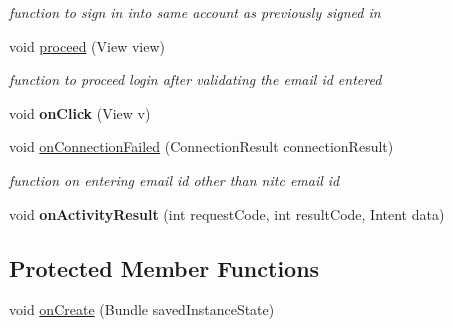 {\begin{DoxyCompactItemize}
\begin{DoxyCompactList}\small\item\em function to sign in into same account as previously signed in \end{DoxyCompactList}\item 
\hypertarget{classcom_1_1example_1_1sel_1_1lostfound_1_1MainActivity_a4618c5d451d4e0c2ce4562499a583ee5}{void \hyperlink{classcom_1_1example_1_1sel_1_1lostfound_1_1MainActivity_a4618c5d451d4e0c2ce4562499a583ee5}{proceed} (View view)}\label{classcom_1_1example_1_1sel_1_1lostfound_1_1MainActivity_a4618c5d451d4e0c2ce4562499a583ee5}

\begin{DoxyCompactList}\small\item\em function to proceed login after validating the email id entered \end{DoxyCompactList}\item 
\hypertarget{classcom_1_1example_1_1sel_1_1lostfound_1_1MainActivity_ac979afc8333ca7e81e7859cd383c614d}{void {\bfseries on\-Click} (View v)}\label{classcom_1_1example_1_1sel_1_1lostfound_1_1MainActivity_ac979afc8333ca7e81e7859cd383c614d}

\item 
\hypertarget{classcom_1_1example_1_1sel_1_1lostfound_1_1MainActivity_a15df38b4157a1f3a7c9dd7c8099e7495}{void \hyperlink{classcom_1_1example_1_1sel_1_1lostfound_1_1MainActivity_a15df38b4157a1f3a7c9dd7c8099e7495}{on\-Connection\-Failed} (Connection\-Result connection\-Result)}\label{classcom_1_1example_1_1sel_1_1lostfound_1_1MainActivity_a15df38b4157a1f3a7c9dd7c8099e7495}

\begin{DoxyCompactList}\small\item\em function on entering email id other than nitc email id \end{DoxyCompactList}\item 
\hypertarget{classcom_1_1example_1_1sel_1_1lostfound_1_1MainActivity_ad934ef9a9347dc67bcaf5365213f58da}{void {\bfseries on\-Activity\-Result} (int request\-Code, int result\-Code, Intent data)}\label{classcom_1_1example_1_1sel_1_1lostfound_1_1MainActivity_ad934ef9a9347dc67bcaf5365213f58da}

\end{DoxyCompactItemize}
\subsection*{Protected Member Functions}
\begin{DoxyCompactItemize}
\item 
\hypertarget{classcom_1_1example_1_1sel_1_1lostfound_1_1MainActivity_ac0ce1d56e609a8b69d6227c6d4d59f48}{void \hyperlink{classcom_1_1example_1_1sel_1_1lostfound_1_1MainActivity_ac0ce1d56e609a8b69d6227c6d4d59f48}{on\-Create} (Bundle saved\-Instance\-State)}\label{classcom_1_1example_1_1sel_1_1lostfound_1_1MainActivity_ac0ce1d56e609a8b69d6227c6d4d59f48}


\end{DoxyCompactItemize}}
